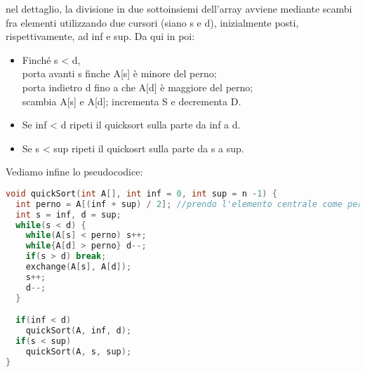 \documentclass[a4paper,12pt]{article}
\begin{document}
nel dettaglio, la divisione in due sottoinsiemi dell'array avviene mediante scambi fra elementi utilizzando due cursori
(siano s e d), inizialmente posti, rispettivamente, ad inf e sup. Da qui in poi:
\begin{itemize}
  \item Finché s < d, \\
    porta avanti s finche A[s] è minore del perno; \\
    porta indietro d fino a che A[d] è maggiore del perno; \\
    scambia A[s] e A[d];
    incrementa S e decrementa D.
  \item Se inf < d ripeti il quicksort sulla parte da inf a d.
  \item Se s < sup ripeti il quickosrt sulla parte da s a sup.
\end{itemize}

Vediamo infine lo pseudocodice:
\begin{lstlisting}[language=C++]
void quickSort(int A[], int inf = 0, int sup = n -1) {
  int perno = A[(inf + sup) / 2]; //prendo l'elemento centrale come perno
  int s = inf, d = sup;
  while(s < d) {
    while(A[s] < perno) s++;
    while{A[d] > perno} d--;
    if(s > d) break;
    exchange(A[s], A[d]);
    s++;
    d--;
  }

  if(inf < d)
    quickSort(A, inf, d);
  if(s < sup)
    quickSort(A, s, sup);
}
\end{lstlisting}
\end{document}
